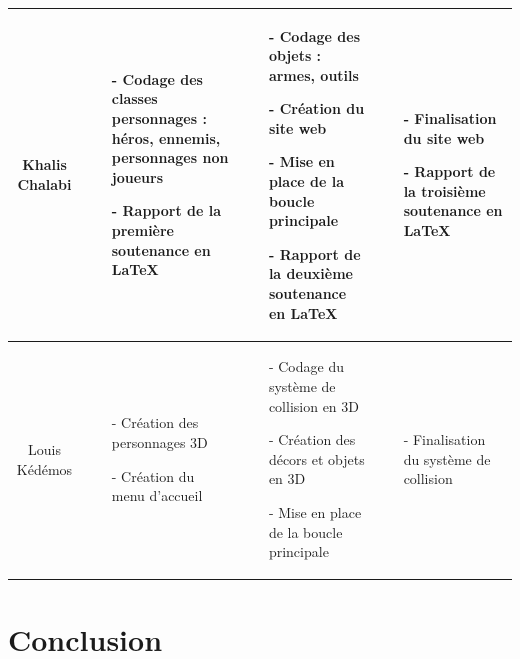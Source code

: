 \documentclass{report}
\begin{document}
\begin{landscape}
\begin{tabular}{|c|p{6cm}|p{6cm}|p{6cm}|}
Khalis Chalabi & 
\begin{itemize}
\item[-] Codage des classes personnages : héros, ennemis, personnages non joueurs
\item[-] Rapport de la première soutenance en \LaTeX
\end{itemize}
 &   
\begin{itemize}
\item[-] Codage des objets : armes, outils
\item[-] Création du site web
\item[-] Mise en place de la boucle principale
\item[-] Rapport de la deuxième soutenance en \LaTeX
\end{itemize}
&
\begin{itemize}
\item[-] Finalisation du site web
\item[-] Rapport de la troisième soutenance en \LaTeX
\end{itemize}
\\
\hline



Louis Kédémos & 
\begin{itemize}
\item[-]  Création des personnages 3D
\item[-]  Création du menu d’accueil
\end{itemize}
 &   
\begin{itemize}
\item[-] Codage du système de collision en 3D
\item[-] Création des décors et objets en 3D
\item[-] Mise en place de la boucle principale
\end{itemize}
&
\begin{itemize}
\item[-]  Finalisation du système de collision
\end{itemize}
\\
\hline



\end{tabular}
\end{landscape}


\newpage

\section[Conclusion]{Conclusion}
\end{document}
